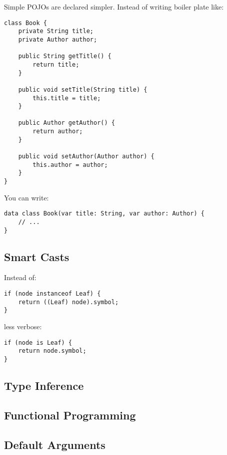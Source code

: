 \documentclass[a4paper,12pt]{report}
\begin{document}
Simple POJOs are declared simpler. Instead of writing boiler plate like:

\begin{verbatim}
class Book {
    private String title;
    private Author author;

    public String getTitle() {
        return title;
    }
    
    public void setTitle(String title) {
        this.title = title;
    }

    public Author getAuthor() {
        return author;
    }
    
    public void setAuthor(Author author) {
        this.author = author;
    }
}
\end{verbatim}

You can write:

\begin{verbatim}
data class Book(var title: String, var author: Author) {
    // ...
}	
\end{verbatim}

\subsection{Smart Casts}

Instead of:

\begin{verbatim}
if (node instanceof Leaf) {
    return ((Leaf) node).symbol;
}	
\end{verbatim}

less verbose:

\begin{verbatim}
if (node is Leaf) {
    return node.symbol;
}	
\end{verbatim}

\subsection{Type Inference}

\subsection{Functional Programming}

\subsection{Default Arguments}
\end{document}
